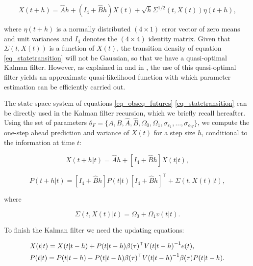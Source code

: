 \documentclass{article}
\begin{document}
\begin{equation} \label{eq_statetransition}
    {X}(t+h) = 
    \widehat{{A}} h + ({I}_4+ \widehat{{B}} h)  {X}(t) + \sqrt{h} {\Sigma}^{1/2}(t,X(t)) {\eta}(t+h),
\end{equation}

\noindent where ${\eta}(t+h)$ is a normally distributed  $(4 \times 1)$ error vector of zero means and unit variances and $I_4$ denotes the $(4 \times 4)$ identity matrix. Given that $\Sigma(t,X(t))$ is a function of $X(t)$, the transition density of equation \eqref{eq_statetransition} will not be Gaussian, so that we have a quasi-optimal Kalman filter. However, as explained in \cite{duan99} and in \cite{ewald21}, the use of this quasi-optimal filter yields an approximate quasi-likelihood function with which parameter estimation can be efficiently carried out. 

The state-space system of equations \eqref{eq_obseq_futures}-\eqref{eq_statetransition} can be directly used in the Kalman filter recursion, which we briefly recall hereafter. Using the set of parameters $\theta_{F} = \{ A, B, \widehat{A}, \widehat{B}, \Omega_0, \Omega_1, \sigma_{\varepsilon_1}, \ldots, \sigma_{\varepsilon_W} \}$, we compute the one-step ahead prediction and variance of $X(t)$ for a step size $h$, conditional to the information at time $t$:

\begin{equation} \label{eq_euler_statevar}
    {X}(t+h|t) = 
    \widehat{{A}} h + \left[{I}_4+ \widehat{{B}} h \right]  {X}(t|t),
\end{equation}

\begin{equation*}
    P(t+h|t) = \left[{I}_4+ \widehat{{B}} h \right] P(t|t) \left[ {I}_4+ \widehat{{B}} h \right]^\top + \Sigma(t, X(t)|t),
\end{equation*}

\noindent where

\begin{equation*}
     \Sigma(t, X(t) |t) = \Omega_0 + \Omega_1 v(t|t).
\end{equation*}

To finish the Kalman filter we need the updating equations:

\begin{align} \label{eq_update_state}
    &X(t|t) = X(t|t-h) + P(t|t-h) \beta(\tau)^\top {V(t|t-h)}^{-1} e(t), \\
    \notag
    &P(t|t) = P(t|t-h) -  P(t|t-h) \beta(\tau)^\top {V(t|t-h)}^{-1} \beta(\tau) P(t|t-h).
\end{align}
\end{document}
